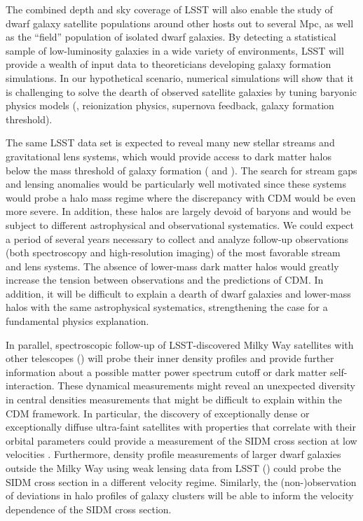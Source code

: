 The combined depth and sky coverage of LSST will also enable the study of dwarf galaxy satellite populations around other hosts out to several Mpc, as well as the ``field'' population of isolated dwarf galaxies.
By detecting a statistical sample of low-luminosity galaxies in a wide variety of environments, LSST will provide a wealth of input data to theoreticians developing galaxy formation simulations.
In our hypothetical scenario, numerical simulations will show that it is challenging to solve the dearth of observed satellite galaxies by tuning baryonic physics models (\eg, reionization physics, supernova feedback, galaxy formation threshold).

The same LSST data set is expected to reveal many new stellar streams and gravitational lens systems, which would provide access to dark matter halos below the mass threshold of galaxy formation ( and ).
The search for stream gaps and lensing anomalies would be particularly well motivated since these systems would probe a halo mass regime where the discrepancy with CDM would be even more severe.
In addition, these halos are largely devoid of baryons and would be subject to different astrophysical and observational systematics.
We could expect a period of several years necessary to collect and analyze follow-up observations (both spectroscopy and high-resolution imaging) of the most favorable stream and lens systems.
The absence of lower-mass dark matter halos would greatly increase the tension between observations and the predictions of CDM.
In addition, it will be difficult to explain a dearth of dwarf galaxies and lower-mass halos with the same astrophysical systematics, strengthening the case for a fundamental physics explanation.


In parallel, spectroscopic follow-up of LSST-discovered Milky Way satellites with other telescopes () will probe their inner density profiles and provide further information about a possible matter power spectrum cutoff or dark matter self-interaction. These dynamical measurements might reveal an unexpected diversity in central densities measurements that might be difficult to explain within the CDM framework. In particular, the discovery of exceptionally dense or exceptionally diffuse ultra-faint satellites with properties that correlate with their orbital parameters could provide a measurement of the SIDM cross section at low velocities \citep{Nishikawa:2019lsc}. Furthermore, density profile measurements of larger dwarf galaxies outside the Milky Way using weak lensing data from LSST () could probe the SIDM cross section in a different velocity regime. Similarly, the (non-)observation of deviations in halo profiles of galaxy clusters will be able to inform the velocity dependence of the SIDM cross section.


